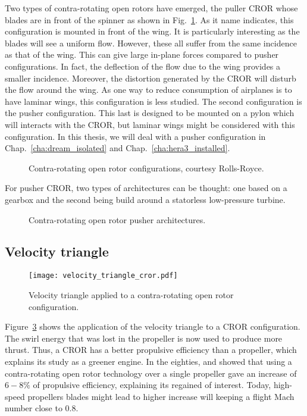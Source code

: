 Two types of contra-rotating open rotors have emerged, the
puller CROR whose blades are in front of the spinner as 
shown in Fig.~\ref{fig:cror_configurations}. As it
name indicates, this configuration is mounted in front of the
wing. It is particularly interesting as the blades will see
a uniform flow. However, these all suffer from the same incidence as that
of the wing. This can give large in-plane forces compared to pusher
configurations. In fact, the deflection of the flow due to the wing provides
a smaller incidence.
Moreover, the distortion generated
by the CROR will disturb the flow around the wing. As one way to reduce
consumption of airplanes is to have laminar wings, this configuration
is less studied. The second configuration is the pusher
configuration. This last is designed to be mounted on a pylon which
will interacts with the CROR, but laminar wings might be considered with
this configuration. In this thesis, we will deal with a pusher configuration
in Chap.~\ref{cha:dream_isolated} and Chap.~\ref{cha:hera3_installed}.
\begin{figure}[htb]
  \centering
  \caption{Contra-rotating open rotor configurations, courtesy Rolls-Royce.}
  \label{fig:cror_configurations}
\end{figure}

For pusher CROR, two types of architectures can be thought:
one based on a gearbox and the second
being build around a statorless low-pressure turbine.
\begin{figure}[htb]
  \centering
  \caption{Contra-rotating open rotor pusher architectures.}
  \label{fig:cror_architectures}
\end{figure}

\subsection{Velocity triangle}
\label{sub:cror_velocity_triangle}
\begin{figure}[htbp]
  \centering
  \texttt{[image: velocity\_triangle\_cror.pdf]}
  \caption{Velocity triangle applied to a contra-rotating open rotor configuration.}
  \label{fig:velocity_triangle_cror}
\end{figure}
Figure~\ref{fig:velocity_triangle_cror} shows the application
of the velocity triangle to a CROR configuration. The swirl
energy that was lost in the propeller is now used to 
produce more thrust. Thus, a CROR has a better propulsive
efficiency than a propeller, which explains its study as
a greener engine. In the eighties, 
\citet{Strack1981} and \citet{Hager1988} showed that
using a contra-rotating open rotor technology over
a single propeller gave an increase of $6-8\%$
of propulsive efficiency, explaining its regained of interest.
Today, high-speed propellers blades might lead to higher increase
will keeping a flight Mach number close to $0.8$.

